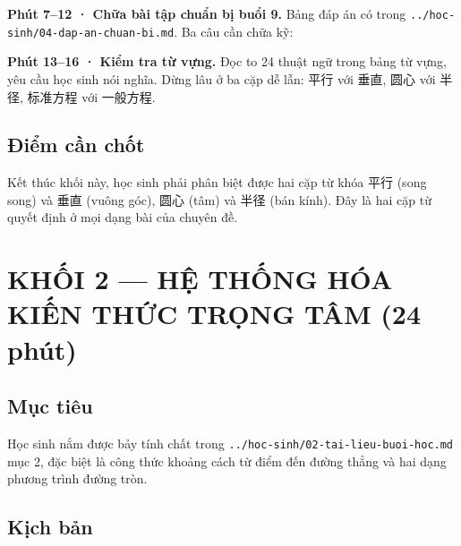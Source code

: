 \documentclass[11pt, a4paper]{article}
\begin{document}
\textbf{Phút 7–12 · Chữa bài tập chuẩn bị buổi 9.} Bảng đáp án có trong \texttt{../hoc-sinh/04-dap-an-chuan-bi.md}. Ba câu cần chữa kỹ:


\textbf{Phút 13–16 · Kiểm tra từ vựng.} Đọc to 24 thuật ngữ trong bảng từ vựng, yêu cầu học sinh nói nghĩa. Dừng lâu ở ba cặp dễ lẫn: 平行 với 垂直, 圆心 với 半径, 标准方程 với 一般方程.

\subsection{Điểm cần chốt}

Kết thúc khối này, học sinh phải phân biệt được hai cặp từ khóa 平行 (song song) và 垂直 (vuông góc), 圆心 (tâm) và 半径 (bán kính). Đây là hai cặp từ quyết định ở mọi dạng bài của chuyên đề.

\section{KHỐI 2 — HỆ THỐNG HÓA KIẾN THỨC TRỌNG TÂM (24 phút)}

\subsection{Mục tiêu}

Học sinh nắm được bảy tính chất trong \texttt{../hoc-sinh/02-tai-lieu-buoi-hoc.md} mục 2, đặc biệt là công thức khoảng cách từ điểm đến đường thẳng và hai dạng phương trình đường tròn.

\subsection{Kịch bản}
\end{document}
